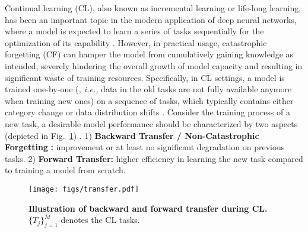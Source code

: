 Continual learning (CL), also known as incremental learning or life-long learning, has been an important topic in the modern application of deep neural networks, where a model is expected to learn a series of tasks sequentially for the optimization of its capability \citep{wang2024comprehensive}. 
However, in practical usage, catastrophic forgetting (CF) \citep{kirkpatrick2017overcoming} can hamper the model from cumulatively gaining knowledge as intended, severely hindering the overall growth of model capacity and resulting in significant waste of training resources.
Specifically, in CL settings, a model is trained one-by-one (\textit{, i.e.,} data in the old tasks are not fully available anymore when training new ones) on a sequence of tasks, which typically contains either category change or data distribution shifts \citep{qu2021recent}. Consider the training process of a new task, a desirable model performance should be characterized by two aspects (depicted in Fig.~\ref{fig:transfer}) \citep{von2020continual}. 1) \textbf{Backward Transfer / Non-Catastrophic Forgetting} \citep{kirkpatrick2017overcoming}\textbf{:} improvement or at least no significant degradation on previous tasks. 2) \textbf{Forward Transfer:} higher efficiency in learning the new task compared to training a model from scratch. 

\begin{figure}[!h]
    \centering
    \texttt{[image: figs/transfer.pdf]}
    \caption{\textbf{Illustration of backward and forward transfer during CL.} $\{T_j\}_{j=1}^{M}$ denotes the CL tasks.}
    \label{fig:transfer}
\end{figure}

